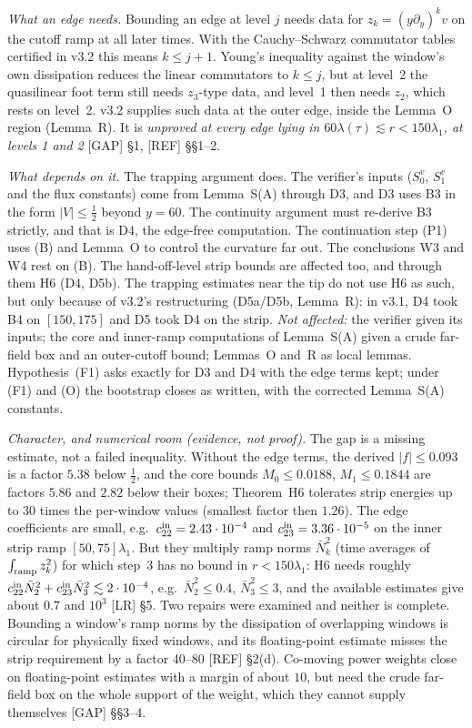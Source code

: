 \documentclass[11pt]{amsart}
\theoremstyle{definition}
\theoremstyle{remark}
\newcommand{\dref}[1]{[\textsf{#1}]}
\begin{document}
\emph{What an edge needs.} Bounding an edge at level $j$ needs data for $z_k=(y\partial_y)^kv$ on the cutoff ramp at all later times. With the Cauchy--Schwarz commutator tables certified in v3.2 this means $k\le j+1$. Young's inequality against the window's own dissipation reduces the linear commutators to $k\le j$, but at level~2 the quasilinear foot term still needs $z_3$-type data, and level~1 then needs $z_2$, which rests on level~2. v3.2 supplies such data at the outer edge, inside the Lemma~O region (Lemma~R). It is \emph{unproved at every edge lying in $60\lambda(\tau)\lesssim r<150\lambda_1$, at levels 1 and 2} \dref{GAP} \S1, \dref{REF} \S\S1--2.

\emph{What depends on it.} The trapping argument does. The verifier's inputs ($S_0^v$, $S_1^v$ and the flux constants) come from Lemma~S(A) through D3, and D3 uses B3 in the form $|V|\le\frac12$ beyond $y=60$. The continuity argument must re-derive B3 strictly, and that is D4, the edge-free computation. The continuation step (P1) uses (B) and Lemma~O to control the curvature far out. The conclusions W3 and W4 rest on (B). The hand-off-level strip bounds are affected too, and through them H6 (D4, D5b). The trapping estimates near the tip do not use H6 as such, but only because of v3.2's restructuring (D5a/D5b, Lemma~R): in v3.1, D4 took B4 on $[150,175]$ and D5 took D4 on the strip. \emph{Not affected:} the verifier given its inputs; the core and inner-ramp computations of Lemma~S(A) given a crude far-field box and an outer-cutoff bound; Lemmas~O and~R as local lemmas. Hypothesis~(F1) asks exactly for D3 and D4 with the edge terms kept; under (F1) and (O) the bootstrap closes as written, with the corrected Lemma~S(A) constants.

\emph{Character, and numerical room (evidence, not proof).} The gap is a missing estimate, not a failed inequality. Without the edge terms, the derived $|f|\le0.093$ is a factor $5.38$ below $\frac12$, and the core bounds $M_0\le0.0188$, $M_1\le0.1844$ are factors $5.86$ and $2.82$ below their boxes; Theorem~H6 tolerates strip energies up to $30$ times the per-window values (smallest factor then $1.26$). The edge coefficients are small, e.g.\ $c^{\rm in}_{22}=2.43\cdot10^{-4}$ and $c^{\rm in}_{23}=3.36\cdot10^{-5}$ on the inner strip ramp $[50,75]\lambda_1$. But they multiply ramp norms $\bar N_k^2$ (time averages of $\int_{\rm ramp}z_k^2$) for which step~3 has no bound in $r<150\lambda_1$: H6 needs roughly $c^{\rm in}_{22}\bar N_2^2+c^{\rm in}_{23}\bar N_3^2\lesssim2\cdot10^{-4}$, e.g.\ $\bar N_2^2\le0.4$, $\bar N_3^2\le3$, and the available estimates give about $0.7$ and $10^3$ \dref{LR} \S5. Two repairs were examined and neither is complete. Bounding a window's ramp norms by the dissipation of overlapping windows is circular for physically fixed windows, and its floating-point estimate misses the strip requirement by a factor 40--80 \dref{REF} \S2(d). Co-moving power weights close on floating-point estimates with a margin of about $10$, but need the crude far-field box on the whole support of the weight, which they cannot supply themselves \dref{GAP} \S\S3--4.
\end{document}
